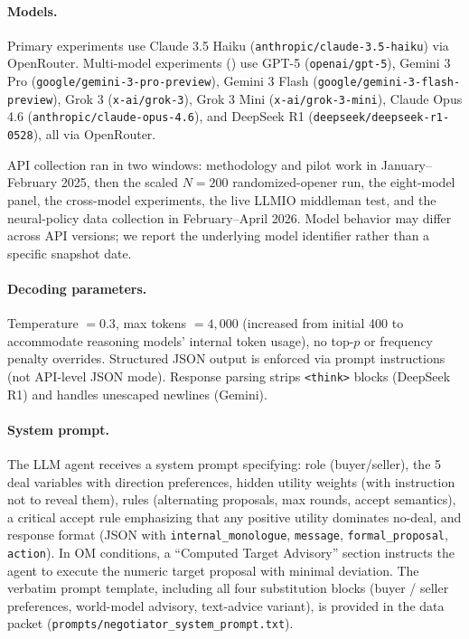 \documentclass[11pt,a4paper]{article}
\begin{document}
\paragraph{Models.} \begin{sloppypar}Primary experiments use Claude 3.5 Haiku (\texttt{anthropic/claude-3.5-haiku}) via OpenRouter. Multi-model experiments () use GPT-5 (\texttt{openai/gpt-5}), Gemini 3 Pro (\texttt{google/gemini-3-pro-preview}), Gemini 3 Flash (\texttt{google/gemini-3-flash-preview}), Grok 3 (\texttt{x-ai/grok-3}), Grok 3 Mini (\texttt{x-ai/grok-3-mini}), Claude Opus 4.6 (\texttt{anthropic/claude-opus-4.6}), and DeepSeek R1 (\texttt{deepseek/deepseek-r1-0528}), all via OpenRouter.\end{sloppypar} API collection ran in two windows: methodology and pilot work in January--February 2025, then the scaled $N\!=\!200$ randomized-opener run, the eight-model panel, the cross-model experiments, the live LLMIO middleman test, and the neural-policy data collection in February--April 2026. Model behavior may differ across API versions; we report the underlying model identifier rather than a specific snapshot date.

\paragraph{Decoding parameters.} Temperature $= 0.3$, max tokens $= 4{,}000$ (increased from initial 400 to accommodate reasoning models' internal token usage), no top-$p$ or frequency penalty overrides. Structured JSON output is enforced via prompt instructions (not API-level JSON mode). Response parsing strips \texttt{<think>} blocks (DeepSeek R1) and handles unescaped newlines (Gemini).

\paragraph{System prompt.} The LLM agent receives a system prompt specifying: role (buyer/seller), the 5 deal variables with direction preferences, hidden utility weights (with instruction not to reveal them), rules (alternating proposals, max rounds, accept semantics), a critical accept rule emphasizing that any positive utility dominates no-deal, and response format (JSON with \texttt{internal\_monologue}, \texttt{message}, \texttt{formal\_proposal}, \texttt{action}). In OM conditions, a ``Computed Target Advisory'' section instructs the agent to execute the numeric target proposal with minimal deviation. The verbatim prompt template, including all four substitution blocks (buyer / seller preferences, world-model advisory, text-advice variant), is provided in the data packet (\texttt{prompts/negotiator\_system\_prompt.txt}).
\end{document}
